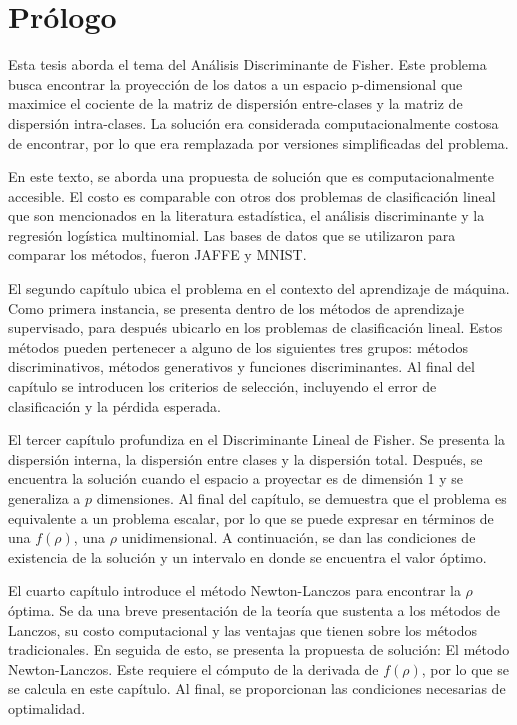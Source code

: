 \chapter{Prólogo}
\label{ch:prologo}


Esta tesis aborda el tema del Análisis Discriminante de Fisher. Este problema busca encontrar la proyección de los datos a un espacio p-dimensional que maximice el cociente de la matriz de dispersión entre-clases y la matriz de dispersión intra-clases. La solución era considerada computacionalmente costosa de encontrar, por lo que era remplazada por versiones simplificadas del problema.

En este texto, se aborda una propuesta de solución que es computacionalmente accesible. El costo es comparable con otros dos problemas de clasificación lineal que son mencionados en la literatura estadística, el análisis discriminante y la regresión logística multinomial. Las bases de datos que se utilizaron para comparar los métodos, fueron JAFFE y MNIST.

El segundo capítulo ubica el problema en el contexto del aprendizaje de máquina. Como primera instancia, se presenta dentro de los métodos de aprendizaje supervisado, para después ubicarlo en los problemas de clasificación lineal. Estos métodos pueden pertenecer a alguno de los siguientes tres grupos: métodos discriminativos, métodos generativos y funciones discriminantes. Al final del capítulo se introducen los criterios de selección, incluyendo el error de clasificación y la pérdida esperada. 

El tercer capítulo profundiza en el Discriminante Lineal de Fisher. Se presenta la dispersión interna, la dispersión entre clases y la dispersión total. Después, se encuentra la solución cuando el espacio a proyectar es de dimensión 1 y se generaliza a $p$ dimensiones. Al final del capítulo, se demuestra que el problema es equivalente a un problema escalar, por lo que se puede expresar en términos de una $f(\rho)$, una $\rho$ unidimensional. A continuación, se dan las condiciones de existencia de la solución y un intervalo en donde se encuentra el valor óptimo.

El cuarto capítulo introduce el método Newton-Lanczos para encontrar la $\rho$ óptima. Se da una breve presentación de la teoría que sustenta a los métodos de Lanczos, su costo computacional y las ventajas que tienen sobre los métodos tradicionales. En seguida de esto, se presenta la propuesta de solución: El método Newton-Lanczos. Este requiere el cómputo de la derivada de $f(\rho)$, por lo que se se calcula en este capítulo. Al final, se proporcionan las condiciones necesarias de optimalidad.

